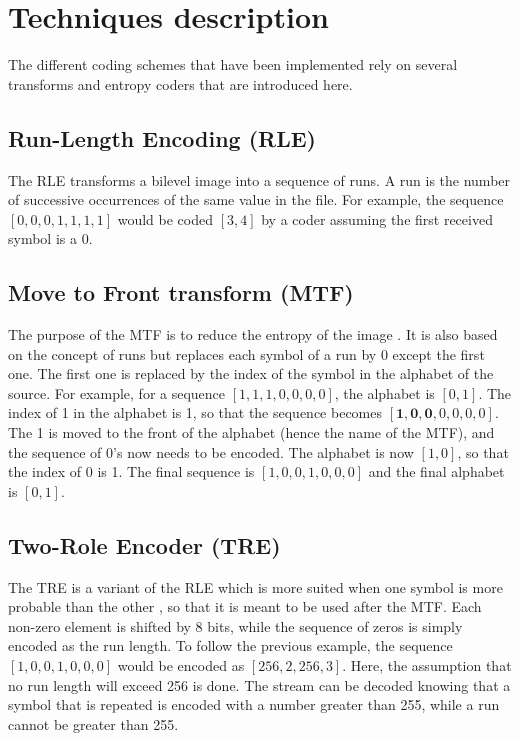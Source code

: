 \vspace*{-0.4cm}
\section{Techniques description}

The different coding schemes that have been implemented rely on several transforms and entropy coders that are introduced here.

\subsection{Run-Length Encoding (RLE)}

The RLE transforms a bilevel image into a sequence of runs. A run is the number of successive occurrences of the same value in the file. For example, the sequence $[0,0,0,1,1,1,1]$ would be coded $[3,4]$ by a coder assuming the first received symbol is a $0$.

\subsection{Move to Front transform (MTF)}

The purpose of the MTF is to reduce the entropy of the image \cite{benzid}. It is also based on the concept of runs but replaces each symbol of a run by 0 except the first one. The first one is replaced by the index of the symbol in the alphabet of the source. For example, for a sequence $[1,1,1,0,0,0,0]$, the alphabet is $[0,1]$. The index of 1 in the alphabet is 1, so that the sequence becomes $[\textbf{1},\textbf{0},\textbf{0},0,0,0,0]$. The 1 is moved to the front of the alphabet (hence the name of the MTF), and the sequence of 0's now needs to be encoded. The alphabet is now $[1,0]$, so that the index of 0 is 1. The final sequence is $[1,0,0,1,0,0,0]$ and the final alphabet is $[0,1]$.

\subsection{Two-Role Encoder (TRE)}

The TRE is a variant of the RLE which is more suited when one symbol is more probable than the other \cite{benzid}, so that it is meant to be used after the MTF. Each non-zero element is shifted by 8 bits, while the sequence of zeros is simply encoded as the run length. To follow the previous example, the sequence $[1,0,0,1,0,0,0]$ would be encoded as $[256,2,256,3]$. Here, the assumption that no run length will exceed 256 is done. The stream can be decoded knowing that a symbol that is repeated is encoded with a number greater than 255, while a run cannot be greater than 255.

